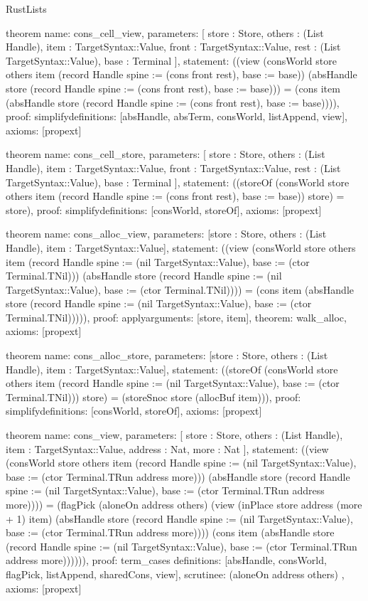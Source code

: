 \begin{lexlean}{RustLists}
\begin{semanticmodule}
theorem{
  name: cons_cell_view,
  parameters: [
    store : Store,
    others : (List Handle),
    item : TargetSyntax::Value,
    front : TargetSyntax::Value,
    rest : (List TargetSyntax::Value),
    base : Terminal
  ],
  statement: ((view (consWorld store others item (record Handle {spine := (cons front rest), base := base})) (absHandle store (record Handle {spine := (cons front rest), base := base}))) = (cons item (absHandle store (record Handle {spine := (cons front rest), base := base})))),
  proof: simplify{definitions: [absHandle, absTerm, consWorld, listAppend, view]},
  axioms: [propext]
}

theorem{
  name: cons_cell_store,
  parameters: [
    store : Store,
    others : (List Handle),
    item : TargetSyntax::Value,
    front : TargetSyntax::Value,
    rest : (List TargetSyntax::Value),
    base : Terminal
  ],
  statement: ((storeOf (consWorld store others item (record Handle {spine := (cons front rest), base := base})) store) = store),
  proof: simplify{definitions: [consWorld, storeOf]},
  axioms: [propext]
}

theorem{
  name: cons_alloc_view,
  parameters: [store : Store, others : (List Handle), item : TargetSyntax::Value],
  statement: ((view (consWorld store others item (record Handle {spine := (nil TargetSyntax::Value), base := (ctor Terminal.TNil)})) (absHandle store (record Handle {spine := (nil TargetSyntax::Value), base := (ctor Terminal.TNil)}))) = (cons item (absHandle store (record Handle {spine := (nil TargetSyntax::Value), base := (ctor Terminal.TNil)})))),
  proof: apply{arguments: [store, item], theorem: walk_alloc},
  axioms: [propext]
}

theorem{
  name: cons_alloc_store,
  parameters: [store : Store, others : (List Handle), item : TargetSyntax::Value],
  statement: ((storeOf (consWorld store others item (record Handle {spine := (nil TargetSyntax::Value), base := (ctor Terminal.TNil)})) store) = (storeSnoc store (allocBuf item))),
  proof: simplify{definitions: [consWorld, storeOf]},
  axioms: [propext]
}

theorem{
  name: cons_view,
  parameters: [
    store : Store,
    others : (List Handle),
    item : TargetSyntax::Value,
    address : Nat,
    more : Nat
  ],
  statement: ((view (consWorld store others item (record Handle {spine := (nil TargetSyntax::Value), base := (ctor Terminal.TRun address more)})) (absHandle store (record Handle {spine := (nil TargetSyntax::Value), base := (ctor Terminal.TRun address more)}))) = (flagPick (aloneOn address others) (view (inPlace store address (more + 1) item) (absHandle store (record Handle {spine := (nil TargetSyntax::Value), base := (ctor Terminal.TRun address more)}))) (cons item (absHandle store (record Handle {spine := (nil TargetSyntax::Value), base := (ctor Terminal.TRun address more)}))))),
  proof: term_cases{
    definitions: [absHandle, consWorld, flagPick, listAppend, sharedCons, view],
    scrutinee: (aloneOn address others)
  },
  axioms: [propext]
}


\end{semanticmodule}
\end{lexlean}
